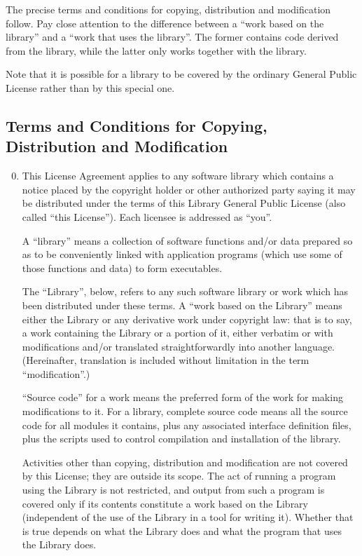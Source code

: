   The precise terms and conditions for copying, distribution and
modification follow.  Pay close attention to the difference between a
``work based on the library'' and a ``work that uses the library''.  The
former contains code derived from the library, while the latter only
works together with the library.

  Note that it is possible for a library to be covered by the ordinary
General Public License rather than by this special one.

\subsection*{Terms and Conditions for Copying, Distribution and Modification}

\begin{enumerate}
\setcounter{enumi}{-1}
\item This License Agreement applies to any software library which
contains a notice placed by the copyright holder or other authorized
party saying it may be distributed under the terms of this Library
General Public License (also called ``this License'').  Each licensee is
addressed as ``you''.

  A ``library'' means a collection of software functions and/or data
prepared so as to be conveniently linked with application programs
(which use some of those functions and data) to form executables.

  The ``Library'', below, refers to any such software library or work
which has been distributed under these terms.  A ``work based on the
Library'' means either the Library or any derivative work under
copyright law: that is to say, a work containing the Library or a
portion of it, either verbatim or with modifications and/or translated
straightforwardly into another language.  (Hereinafter, translation is
included without limitation in the term ``modification''.)

``Source code'' for a work means the preferred form of the work for
making modifications to it.  For a library, complete source code means
all the source code for all modules it contains, plus any associated
interface definition files, plus the scripts used to control compilation
and installation of the library.

  Activities other than copying, distribution and modification are not
covered by this License; they are outside its scope.  The act of
running a program using the Library is not restricted, and output from
such a program is covered only if its contents constitute a work based
on the Library (independent of the use of the Library in a tool for
writing it).  Whether that is true depends on what the Library does
and what the program that uses the Library does.
  

\end{enumerate}
